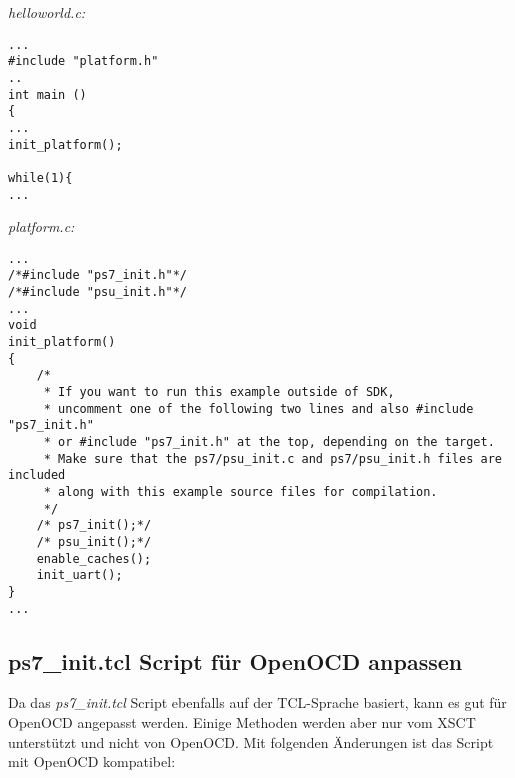 \textit{helloworld.c:}
\lstset{language=c}
\begin{lstlisting}[frame=single]
...
#include "platform.h"
..
int main ()
{
...
init_platform();

while(1){
...
\end{lstlisting}



\textit{platform.c:}
\lstset{language=c}
\begin{lstlisting}[frame=single]
...
/*#include "ps7_init.h"*/
/*#include "psu_init.h"*/
...
void
init_platform()
{
    /*
     * If you want to run this example outside of SDK,
     * uncomment one of the following two lines and also #include "ps7_init.h"
     * or #include "ps7_init.h" at the top, depending on the target.
     * Make sure that the ps7/psu_init.c and ps7/psu_init.h files are included
     * along with this example source files for compilation.
     */
    /* ps7_init();*/
    /* psu_init();*/
    enable_caches();
    init_uart();
}
...

\end{lstlisting}




\subsection{ps7\_init.tcl Script für OpenOCD anpassen}
Da das \textit{ps7\_init.tcl} Script ebenfalls auf der TCL-Sprache basiert, kann es gut für OpenOCD angepasst werden.
Einige Methoden werden aber nur vom XSCT unterstützt und nicht von OpenOCD.
Mit folgenden Änderungen ist das Script mit OpenOCD kompatibel:

